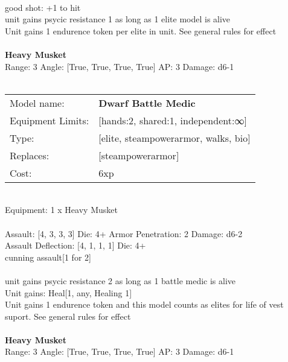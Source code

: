 \ \\
good shot: +1 to hit\\ 
unit gains psycic resistance 1 as long as 1 elite model is alive\\ 
Unit gains 1 endurence token per elite in unit. See general rules for effect\\ 

\ \\
{\bf Heavy Musket } \\



Range: 3  Angle: [True, True, True, True] AP: 3 Damage: d6-1 \\




 
\ \\

\noindent
\begin{tabular}{ll}
Model name: &{\bf Dwarf Battle Medic } \\
Equipment Limits: &[hands:2, shared:1, independent:∞] \\
Type: &[elite, steampowerarmor, walks, bio] \\
Replaces: &[steampowerarmor] \\
Cost: & 6xp\\
\end{tabular}
\ \\
Equipment: 1 x Heavy Musket \\
\ \\
Assault: [4, 3, 3, 3] Die: 4+ Armor Penetration: 2 Damage: d6-2 \\
Assault Deflection: [4, 1, 1, 1] Die: 4+\\
\indent cunning assault[1 for 2]\\ 
 
\ \\
unit gains psycic resistance 2 as long as 1 battle medic is alive\\ 
Unit gains: Heal[1, any, Healing 1]\\ 
Unit gains 1 endurence token and this model counts as elites for life of vest suport. See general rules for effect\\ 

\ \\
{\bf Heavy Musket } \\



Range: 3  Angle: [True, True, True, True] AP: 3 Damage: d6-1 \\




